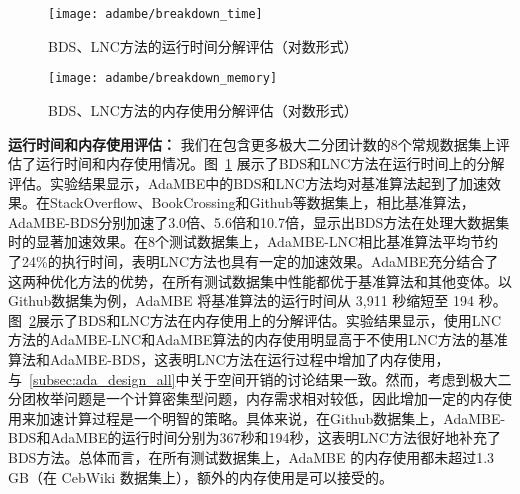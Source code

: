 



\begin{figure} [H]
	\centering
	\texttt{[image: adambe/breakdown\_time]}
	\caption{BDS、LNC方法的运行时间分解评估（对数形式）}

	\label{fig:ada_breakdown_time}
\end{figure}

\begin{figure} [H]
	\centering
	\texttt{[image: adambe/breakdown\_memory]}
	\caption{BDS、LNC方法的内存使用分解评估（对数形式）}

	\label{fig:ada_breakdown_memory}
\end{figure}


\textbf{运行时间和内存使用评估：} 我们在包含更多极大二分团计数的8个常规数据集上评估了运行时间和内存使用情况。图~\ref{fig:ada_breakdown_time} 展示了BDS和LNC方法在运行时间上的分解评估。实验结果显示，AdaMBE中的BDS和LNC方法均对基准算法起到了加速效果。在StackOverflow、BookCrossing和Github等数据集上，相比基准算法，AdaMBE-BDS分别加速了3.0倍、5.6倍和10.7倍，显示出BDS方法在处理大数据集时的显著加速效果。在8个测试数据集上，AdaMBE-LNC相比基准算法平均节约了24\%的执行时间，表明LNC方法也具有一定的加速效果。AdaMBE充分结合了这两种优化方法的优势，在所有测试数据集中性能都优于基准算法和其他变体。以Github数据集为例，AdaMBE 将基准算法的运行时间从 3,911 秒缩短至 194 秒。图~\ref{fig:ada_breakdown_memory}展示了BDS和LNC方法在内存使用上的分解评估。实验结果显示，使用LNC方法的AdaMBE-LNC和AdaMBE算法的内存使用明显高于不使用LNC方法的基准算法和AdaMBE-BDS，这表明LNC方法在运行过程中增加了内存使用，与~\ref{subsec:ada_design_all}中关于空间开销的讨论结果一致。然而，考虑到极大二分团枚举问题是一个计算密集型问题，内存需求相对较低，因此增加一定的内存使用来加速计算过程是一个明智的策略。具体来说，在Github数据集上，AdaMBE-BDS和AdaMBE的运行时间分别为367秒和194秒，这表明LNC方法很好地补充了BDS方法。总体而言，在所有测试数据集上，AdaMBE 的内存使用都未超过1.3 GB（在 CebWiki 数据集上），额外的内存使用是可以接受的。



